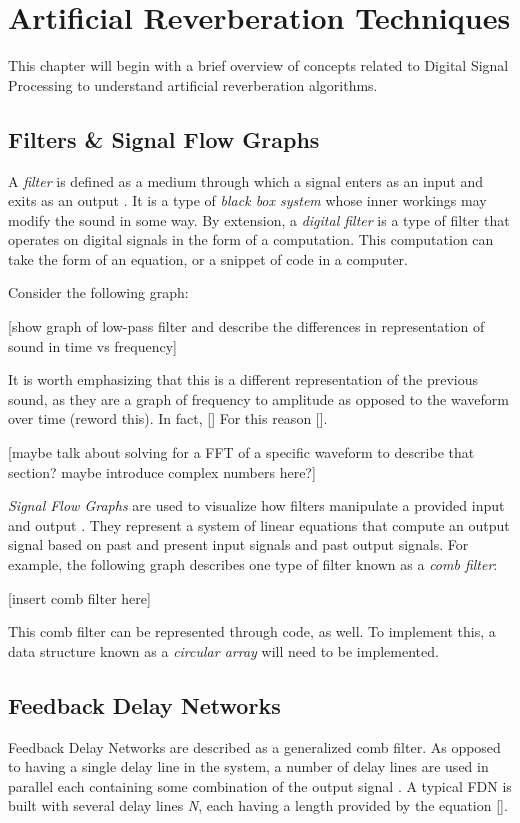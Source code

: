\chapter{Artificial Reverberation Techniques}
\hspace*{-0.15cm}This chapter will begin with a brief overview of concepts related to Digital Signal Processing to understand artificial reverberation algorithms.

\section{Filters \& Signal Flow Graphs}
A \textit{filter} is defined as a medium through which a signal enters as an input and exits as an output \cite{FILTERS07}. It is a type of \textit{black box system} whose inner workings may modify the sound in some way. By extension, a \textit{digital filter} is a type of filter that operates on digital signals in the form of a computation. This computation can take the form of an equation, or a snippet of code in a computer.

Consider the following graph:

[show graph of low-pass filter and describe the differences in representation of sound in time vs frequency]

It is worth emphasizing that this is a different representation of the previous sound, as they are a graph of frequency to amplitude as opposed to the waveform over time (reword this). In fact, [] For this reason [].

[maybe talk about solving for a FFT of a specific waveform to describe that section? maybe introduce complex numbers here?]

\textit{Signal Flow Graphs} are used to visualize how filters manipulate a provided input and output \cite{FILTERS07}. They represent a system of linear equations that compute an output signal based on past and present input signals and past output signals. For example, the following graph describes one type of filter known as a \textit{comb filter}:

[insert comb filter here]


This comb filter can be represented through code, as well. To implement this, a data structure known as a \textit{circular array} will need to be implemented.


\section{Feedback Delay Networks}
Feedback Delay Networks are described as a generalized comb filter. As opposed to having a single delay line in the system, a number of delay lines are used in parallel each containing some combination of the output signal \cite{PUCKE}. A typical FDN is built with several delay lines \textit{N}, each having a length provided by the equation [].

